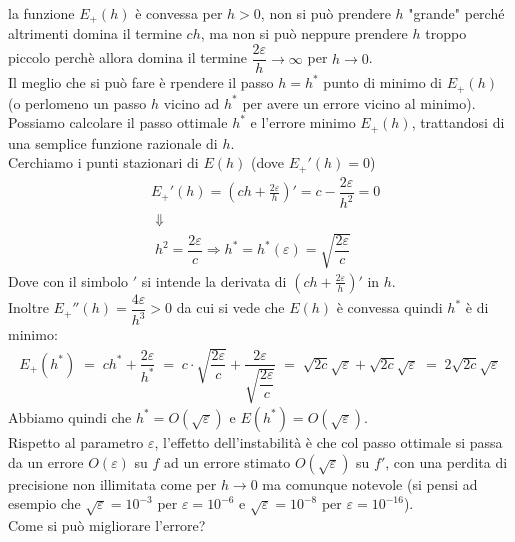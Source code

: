 \documentclass[12pt,a4paper]{article}
\begin{document}
la funzione $E_+(h)$ è convessa per $h>0$, non si può prendere $h$ "grande" perché altrimenti domina il termine $ch$, ma
non si può neppure prendere $h$ troppo piccolo perchè allora domina il termine $\dfrac{2\varepsilon}{h}\to \infty$ per $h\to 0$.\\
Il meglio che si può fare è rpendere il passo $h=h^*$ punto di minimo di $E_+(h)$ (o perlomeno un passo $h$ vicino ad $h^*$ per avere un errore vicino al minimo).\\
Possiamo calcolare il passo ottimale $h^*$ e l'errore minimo $E_+(h)$, trattandosi di una semplice funzione razionale di $h$.\\
Cerchiamo i punti stazionari di $E(h)$ (dove $E_+'(h)=0$)
\[ \begin{split}
	& E_+'(h)=\left( ch+\frac{2\varepsilon}{h}\right) ' =c-\dfrac{2\varepsilon}{h^2}=0 \\
	& \; \Downarrow \\
	& \; h^2=\dfrac{2\varepsilon}{c}\Rightarrow h^*=h^*(\varepsilon)=\sqrt{\dfrac{2\varepsilon}{c}}
\end{split} \]
Dove con il simbolo $'$ si intende la derivata di $\left( ch+\frac{2\varepsilon}{h}\right) '$ in $h$.\\
Inoltre $E_+''(h)=\dfrac{4\varepsilon}{h^3}>0$ da cui si vede che $E(h)$ è convessa quindi $h^*$ è di minimo:
\[ \begin{split}
	E_+(h^*) \; = \; ch^* + \dfrac{2\varepsilon}{h^*} \; = \; c\cdot \sqrt{\dfrac{2\varepsilon}{c}} + \dfrac{2\varepsilon}{\sqrt{\dfrac{2\varepsilon}{c}}} \; = \; \sqrt{2c} \sqrt{\varepsilon} + \sqrt{2c} \sqrt{\varepsilon} \; = \; 2 \sqrt{2c} \sqrt{\varepsilon}
\end{split} \]
Abbiamo quindi che $h^*=O(\sqrt{\varepsilon})$ e $E(h^*)=O(\sqrt{\varepsilon})$.\\
Rispetto al parametro $\varepsilon$, l'effetto dell'instabilità è che col passo ottimale si passa da un errore $O(\varepsilon)$ su $f$ ad un errore stimato $O(\sqrt{\varepsilon})$ su $f'$, con una perdita di precisione non illimitata come per $h\to 0$ ma comunque notevole (si pensi ad esempio che $\sqrt{\varepsilon}=10^{-3}$ per $\varepsilon=10^{-6}$ e $\sqrt{\varepsilon}=10^{-8}$ per $\varepsilon=10^{-16}$).\\
Come si può migliorare l'errore?\\
\end{document}
